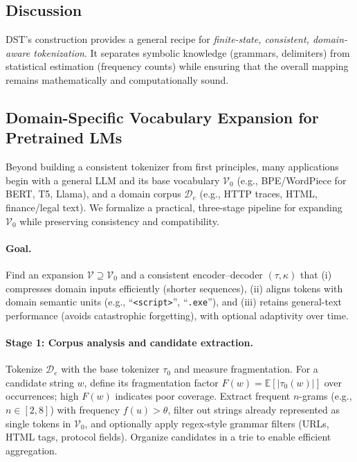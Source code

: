 \subsection{Discussion}
DST’s construction provides a general recipe for
\emph{finite-state, consistent, domain-aware tokenization}.
It separates symbolic knowledge (grammars, delimiters)
from statistical estimation (frequency counts)
while ensuring that the overall mapping
remains mathematically and computationally sound.

\subsection{Domain-Specific Vocabulary Expansion for Pretrained LMs}
\label{sec:method-dsv}

Beyond building a consistent tokenizer from first principles, many applications begin with a general LLM and its base vocabulary $\mathcal{V}_0$ (e.g., BPE/WordPiece for BERT, T5, Llama), and a domain corpus $\mathcal{D}_e$ (e.g., HTTP traces, HTML, finance/legal text). We formalize a practical, three-stage pipeline for expanding $\mathcal{V}_0$ while preserving consistency and compatibility.

\paragraph{Goal.} Find an expansion $\mathcal{V}\supseteq\mathcal{V}_0$ and a consistent encoder–decoder $(\tau,\kappa)$ that (i) compresses domain inputs efficiently (shorter sequences), (ii) aligns tokens with domain semantic units (e.g., “\texttt{<script>}”, “\texttt{.exe}”), and (iii) retains general-text performance (avoids catastrophic forgetting), with optional adaptivity over time.

\paragraph{Stage 1: Corpus analysis and candidate extraction.} Tokenize $\mathcal{D}_e$ with the base tokenizer $\tau_0$ and measure fragmentation. For a candidate string $w$, define its fragmentation factor $F(w)=\mathbb{E}[|\tau_0(w)|]$ over occurrences; high $F(w)$ indicates poor coverage. Extract frequent $n$-grams (e.g., $n\in[2,8]$) with frequency $f(u)>\theta$, filter out strings already represented as single tokens in $\mathcal{V}_0$, and optionally apply regex-style grammar filters (URLs, HTML tags, protocol fields). Organize candidates in a trie to enable efficient aggregation.

